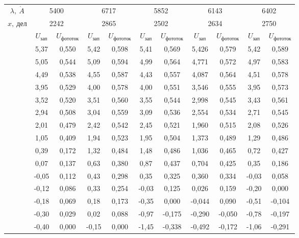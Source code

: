 \documentclass{lab}
\renewcommand{\AA}{\ensuremath{\mathring{A}}}
\begin{document}
\begin{enumerate}
\begin{table}[H]
	\centering \small
	\begin{tabular}{|c|cc|cc|cc|cc|cc|}
		\hline
		$ \lambda,~\AA{} $  & \multicolumn{2}{c|}{5400} & \multicolumn{2}{c|}{6717} & \multicolumn{2}{c|}{5852} & \multicolumn{2}{c|}{6143} & \multicolumn{2}{c|}{6402} \\
		$ x,~дел $          & \multicolumn{2}{c|}{2242} & \multicolumn{2}{c|}{2865} & \multicolumn{2}{c|}{2502} & \multicolumn{2}{c|}{2634} & \multicolumn{2}{c|}{2750} \\ \hline
		& $ U_{зап} $ & $ U_{фототок} $ & $ U_{зап} $ & $ U_{фототок} $ & $ U_{зап} $ & $ U_{фототок} $ & $ U_{зап} $ & $ U_{фототок} $ & $ U_{зап} $ & $ U_{фототок} $\\
		&5,37	&0,550	&5,42	&0,598	&5,41	&0,569	&5,426	&0,579	&5,42	&0,589\\
		&5,05	&0,544	&5,09	&0,594	&4,99	&0,564	&4,771	&0,572	&4,97	&0,583\\
		&4,49	&0,538	&4,55	&0,587	&4,43	&0,557	&4,087	&0,564	&4,51	&0,578\\
		&3,95	&0,529	&4,00	&0,578	&4,00	&0,551	&3,546	&0,555	&3,95	&0,573\\
		&3,52	&0,520	&3,51	&0,560	&3,55	&0,544	&2,998	&0,545	&3,43	&0,561\\
		&2,94	&0,508	&3,04	&0,559	&3,09	&0,536	&2,554	&0,534	&2,71	&0,545\\
		&2,01	&0,479	&2,42	&0,542	&2,45	&0,521	&1,960	&0,515	&2,08	&0,526\\
		&1,05	&0,409	&1,94	&0,523	&1,95	&0,504	&1,373	&0,489	&1,29	&0,486\\
		&0,39	&0,172	&1,32	&0,484	&1,48	&0,486	&1,036	&0,465	&0,72	&0,427\\
		&0,07	&0,137	&0,63	&0,380	&0,87	&0,437	&0,704	&0,425	&0,35	&0,186\\
		&-0,05	&0,112	&0,43	&0,298	&0,35	&0,325	&0,360	&0,334	&-0,03	&0,058\\
		&-0,12	&0,086	&0,33	&0,254	&-0,03	&0,125	&0,026	&0,159	&-0,20	&0,000\\
		&-0,18	&0,069	&0,18	&0,173	&-0,35	&0,000	&-0,044	&0,090	&-0,51	&-0,104\\
		&-0,30	&0,029	&0,02	&0,088	&-0,97	&-0,175	&-0,290	&-0,050	&-0,78	&-0,197\\
		&-0,40	&0,000	&-0,15	&0,000	&-1,45	&-0,338	&-0,492	&-0,172	&-1,06	&-0,291\\ \hline
		
	\end{tabular}
	\label{tab2}
\end{table}


\end{enumerate}
\end{document}
